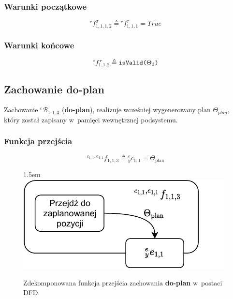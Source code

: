 \subsubsection{Warunki początkowe}
\begin{equation}
    {}^{c}f^{\sigma}_{1,1,1,2} \triangleq {}^{c}f^{\tau}_{1,1,1} = True
\end{equation}

\subsubsection{Warunki końcowe}
\begin{equation}
    {}^{c}f^{\tau}_{1,1,2} \triangleq \text{\texttt{isValid($\Theta_{\mathrm{d}}$)}}
\end{equation}



\subsection{Zachowanie do-plan}
\label{subsec:cs-do-plan}
Zachowanie ${}^{c}\mathcal{B}_{1,1,3}$ (\textbf{do-plan}), realizuje wcześniej wygenerowany plan $\Theta_{plan}$, który został zapisany w~pamięci wewnętrznej podsystemu.

\subsubsection{Funkcja przejścia}
\begin{equation}
    {}^{c_{1,1}, e_{1,1}}f_{1,1,3} \triangleq {}^{e}_{y}c_{1,1} = \Theta_{\mathrm{plan}}
\end{equation}

\begin{figure}[ht]
    \leftskip1.5em
    \includegraphics[width=\columnwidth]{figures/ISR-cs-fp-do-plan.pdf}
    \caption{Zdekomponowana funkcja przejścia zachowania \textbf{do-plan} w~postaci DFD}
    \label{fig:cs-fp-do-plan}
\end{figure}

